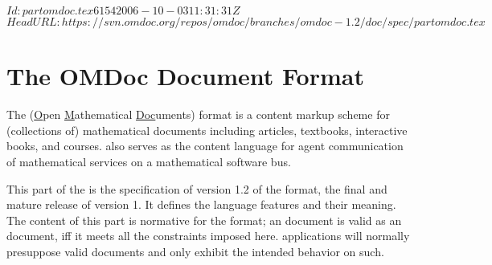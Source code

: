 \svnInfo $Id: partomdoc.tex 6154 2006-10-03 11:31:31Z  $
\svnKeyword $HeadURL: https://svn.omdoc.org/repos/omdoc/branches/omdoc-1.2/doc/spec/partomdoc.tex $

\part{The OMDoc Document Format}\label{part:specification}
  The {\omdoc} (\underline{O}pen \underline{M}athematical \underline{Doc}uments) format is
  a content markup scheme for (collections of) mathematical documents including articles,
  textbooks, interactive books, and courses.  {\omdoc} also serves as the content language
  for agent communication of mathematical services on a mathematical software bus.

  This part of the {\report} is the specification of version 1.2 of the {\omdoc} format,
  the final and mature release of {\omdoc} version 1. It defines the {\omdoc} language
  features and their meaning. The content of this part is normative for the {\omdoc}
  format; an {\omdoc} document is valid as an {\omdoc} document, iff it meets all the
  constraints imposed here. {\omdoc} applications will normally presuppose valid {\omdoc}
  documents and only exhibit the intended behavior on such.





